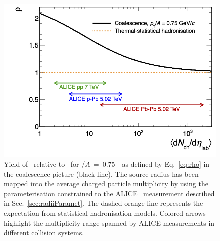 \documentclass[%
 reprint,
 amsmath,amssymb,
 aps,
]{revtex4-1}
\begin{document}
\begin{figure}[!h]
	\begin{center}
		\includegraphics[width=\columnwidth]{RhoTritiumOver3HeliumVsMulti.png}
		\caption{Yield of \tritium~relative to \hethree~for \pt/$A$~=~0.75~\GeVc~as defined by Eq.~\ref{eq:rho} in the coalescence picture (black line). The source radius has been mapped into the average charged particle multiplicity by using the parameterisation constrained to the ALICE \btwo~measurement described in Sec.~\ref{sec:radiiParamet}. The dashed orange line represents the expectation from statistical hadronisation models. Colored arrows highlight the multiplicity range spanned by ALICE measurements in different collision systems.}
		\label{fig:rhoratio}
	\end{center}
\end{figure}
\end{document}
